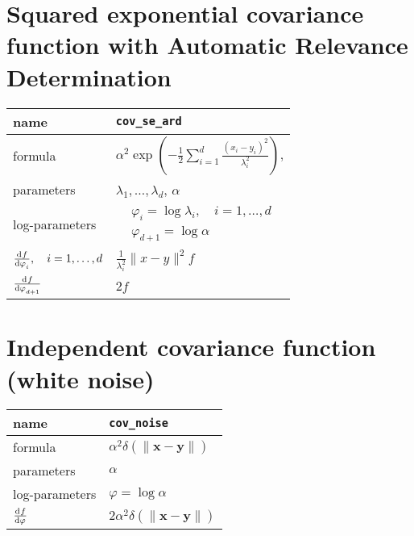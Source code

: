\documentclass[fleqn]{article}
\newcommand{\NL}{\\ \midrule} %
\begin{document}
\section{Squared exponential covariance function with Automatic Relevance Determination}

\begin{tabularx}{\textwidth}{@{} X X @{}}
%
name & \verb|cov_se_ard|  \NL
 formula &  $\displaystyle \alpha^2 \exp\left( -\frac{1}{2} \sum_{i=1}^d  \frac{(x_i-y_i)^2}{\lambda_i^2} \right) $,  \NL
% 
parameters & $\lambda_1,\ldots,\lambda_d$, $\alpha$  \NL
% 
log-parameters & $ \begin{aligned} & \varphi_i = \log \lambda_i, \quad i=1,\ldots,d \\  & \varphi_{d+1} = \log \alpha \end{aligned} $ \NL
%
$\displaystyle \od{f}{\varphi_i} , \quad i=1,\ldots,d $ & $\displaystyle \frac{1}{\lambda_{i}^2} \|x-y\|^2 f$ \NL
$\displaystyle \od{f}{\varphi_{d+1}}$ & $2f$ \NL
%
\end{tabularx}








\section{Independent covariance function (white noise)}

\begin{tabularx}{\textwidth}{@{} X X @{}}
%
 name & \verb|cov_noise|  \NL
 formula &  $\alpha^2 \delta(\|\bm{x}-\bm{y}\|) $  \NL
% 
parameters & $\alpha$  \NL
% 
log-parameters & $\varphi = \log \alpha $ \NL
%
$\displaystyle \od{f}{\varphi}$ & $2\alpha^2 \delta(\|\bm{x}-\bm{y}\|)$ \NL
%
\end{tabularx}
\end{document}
